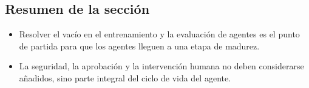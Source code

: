 \subsection{Resumen de la sección}
\begin{itemize}
    \item Resolver el vacío en el entrenamiento y la evaluación de agentes es el punto de partida para que los agentes lleguen a una etapa de madurez.
    \item La seguridad, la aprobación y la intervención humana no deben considerarse añadidos, sino parte integral del ciclo de vida del agente.
\end{itemize}

